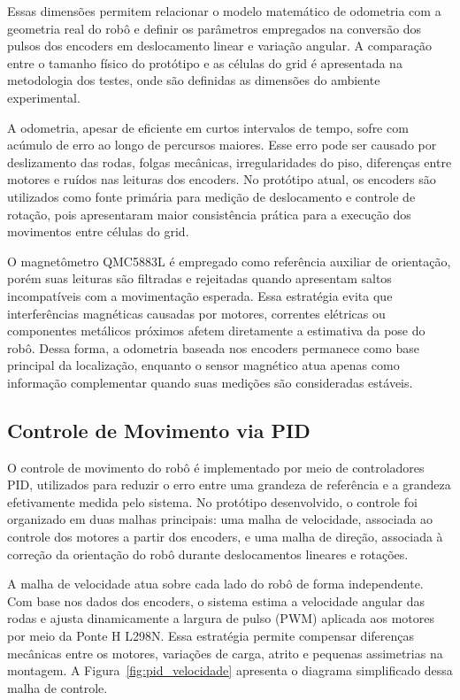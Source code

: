 \documentclass[	12pt, Times, openright, twoside, a4paper, english, brazil]{abntex2}
\begin{document}
Essas dimensões permitem relacionar o modelo matemático de odometria com a geometria real do robô e definir os parâmetros empregados na conversão dos pulsos dos encoders em deslocamento linear e variação angular. A comparação entre o tamanho físico do protótipo e as células do grid é apresentada na metodologia dos testes, onde são definidas as dimensões do ambiente experimental.

A odometria, apesar de eficiente em curtos intervalos de tempo, sofre com acúmulo de erro ao longo de percursos maiores. Esse erro pode ser causado por deslizamento das rodas, folgas mecânicas, irregularidades do piso, diferenças entre motores e ruídos nas leituras dos encoders. No protótipo atual, os encoders são utilizados como fonte primária para medição de deslocamento e controle de rotação, pois apresentaram maior consistência prática para a execução dos movimentos entre células do grid.

O magnetômetro QMC5883L é empregado como referência auxiliar de orientação, porém suas leituras são filtradas e rejeitadas quando apresentam saltos incompatíveis com a movimentação esperada. Essa estratégia evita que interferências magnéticas causadas por motores, correntes elétricas ou componentes metálicos próximos afetem diretamente a estimativa da pose do robô. Dessa forma, a odometria baseada nos encoders permanece como base principal da localização, enquanto o sensor magnético atua apenas como informação complementar quando suas medições são consideradas estáveis.

\subsection{Controle de Movimento via PID}

O controle de movimento do robô é implementado por meio de controladores PID, utilizados para reduzir o erro entre uma grandeza de referência e a grandeza efetivamente medida pelo sistema. No protótipo desenvolvido, o controle foi organizado em duas malhas principais: uma malha de velocidade, associada ao controle dos motores a partir dos encoders, e uma malha de direção, associada à correção da orientação do robô durante deslocamentos lineares e rotações.

A malha de velocidade atua sobre cada lado do robô de forma independente. Com base nos dados dos encoders, o sistema estima a velocidade angular das rodas e ajusta dinamicamente a largura de pulso (PWM) aplicada aos motores por meio da Ponte H L298N. Essa estratégia permite compensar diferenças mecânicas entre os motores, variações de carga, atrito e pequenas assimetrias na montagem. A Figura~\ref{fig:pid_velocidade} apresenta o diagrama simplificado dessa malha de controle.
\end{document}
